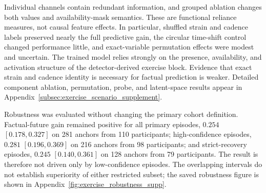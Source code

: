 \begin{table}[H]
  \centering
  \caption{%
    \textbf{Functional ablations on identical held-out anchors.}
    Terminal and mean absolute effects are in mg/dL.%
  }
  \label{tab:exercise_functional_ablation}
  \scriptsize
\end{table}

Individual channels contain redundant information, and grouped ablation changes
both values and availability-mask semantics. These are functional reliance
measures, not causal feature effects. In particular, shuffled strain and
cadence labels preserved nearly the full predictive gain, the circular
time-shift control changed performance little, and exact-variable permutation
effects were modest and uncertain. The trained model relies strongly on the
presence, availability, and activation structure of the detector-derived
exercise block. Evidence that exact strain and cadence identity is necessary
for factual prediction is weaker. Detailed component ablation, permutation,
probe, and latent-space results appear in
Appendix~\ref{subsec:exercise_scenario_supplement}.

Robustness was evaluated without changing the primary cohort definition.
Factual-future gain remained positive for all primary episodes, $0.254$
$[0.178,0.327]$ on 281 anchors from 110 participants; high-confidence episodes,
$0.281$ $[0.196,0.369]$ on 216 anchors from 98 participants; and strict-recovery
episodes, $0.245$ $[0.140,0.361]$ on 128 anchors from 79 participants. The
result is therefore not driven only by low-confidence episodes. The overlapping
intervals do not establish superiority of either restricted subset; the saved
robustness figure is shown in Appendix~\ref{fig:exercise_robustness_supp}.

